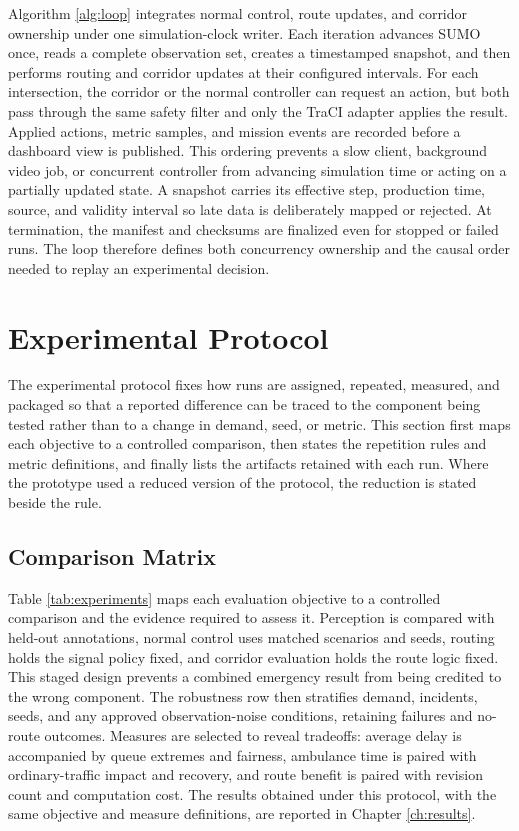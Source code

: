 Algorithm \ref{alg:loop} integrates normal control, route updates, and corridor ownership under one simulation-clock writer. Each iteration advances SUMO once, reads a complete observation set, creates a timestamped snapshot, and then performs routing and corridor updates at their configured intervals. For each intersection, the corridor or the normal controller can request an action, but both pass through the same safety filter and only the TraCI adapter applies the result. Applied actions, metric samples, and mission events are recorded before a dashboard view is published. This ordering prevents a slow client, background video job, or concurrent controller from advancing simulation time or acting on a partially updated state. A snapshot carries its effective step, production time, source, and validity interval so late data is deliberately mapped or rejected. At termination, the manifest and checksums are finalized even for stopped or failed runs. The loop therefore defines both concurrency ownership and the causal order needed to replay an experimental decision.

\section{Experimental Protocol}

The experimental protocol fixes how runs are assigned, repeated, measured, and packaged so that a reported difference can be traced to the component being tested rather than to a change in demand, seed, or metric. This section first maps each objective to a controlled comparison, then states the repetition rules and metric definitions, and finally lists the artifacts retained with each run. Where the prototype used a reduced version of the protocol, the reduction is stated beside the rule.

\subsection{Comparison Matrix}

Table \ref{tab:experiments} maps each evaluation objective to a controlled comparison and the evidence required to assess it. Perception is compared with held-out annotations, normal control uses matched scenarios and seeds, routing holds the signal policy fixed, and corridor evaluation holds the route logic fixed. This staged design prevents a combined emergency result from being credited to the wrong component. The robustness row then stratifies demand, incidents, seeds, and any approved observation-noise conditions, retaining failures and no-route outcomes. Measures are selected to reveal tradeoffs: average delay is accompanied by queue extremes and fairness, ambulance time is paired with ordinary-traffic impact and recovery, and route benefit is paired with revision count and computation cost. The results obtained under this protocol, with the same objective and measure definitions, are reported in Chapter \ref{ch:results}.

